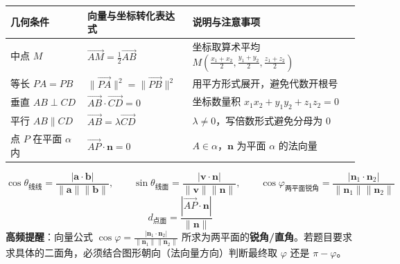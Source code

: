 \documentclass[11pt,a4paper]{ctexart}
\begin{document}
\begin{tcolorbox}[colback=white,colframe=rulecolor,boxrule=0.55pt,arc=1mm,title={四、常见几何条件的坐标翻译表},fonttitle=\bfseries]
\begin{tabularx}{\textwidth}{p{3.5cm}Xp{4.2cm}}
\toprule
几何条件 & 向量与坐标转化表达式 & 说明与注意事项 \\
\midrule
中点 $M$ & $\overrightarrow{AM} = \frac{1}{2}\overrightarrow{AB}$ & 坐标取算术平均 $M\left(\frac{x_1+x_2}{2},\frac{y_1+y_2}{2},\frac{z_1+z_2}{2}\right)$ \\ \hline
等长 $PA=PB$ & $\|\overrightarrow{PA}\|^2 = \|\overrightarrow{PB}\|^2$ & 用平方形式展开，避免代数开根号 \\ \hline
垂直 $AB\perp CD$ & $\overrightarrow{AB}\cdot\overrightarrow{CD} = 0$ & 坐标数量积 $x_1 x_2 + y_1 y_2 + z_1 z_2 = 0$ \\ \hline
平行 $AB\parallel CD$ & $\overrightarrow{AB} = \lambda\overrightarrow{CD}$ & $\lambda\neq 0$，写倍数形式避免分母为 $0$ \\ \hline
点 $P$ 在平面 $\alpha$ 内 & $\overrightarrow{AP}\cdot\boldsymbol{n} = 0$ & $A\in\alpha$，$\boldsymbol{n}$ 为平面 $\alpha$ 的法向量 \\
\bottomrule
\end{tabularx}
\end{tcolorbox}

\begin{tcolorbox}[colback=white,colframe=rulecolor,boxrule=0.55pt,arc=1mm,title={五、三类空间角与点面距离公式},fonttitle=\bfseries]
\[
  \cos\theta_{\text{线线}} = \frac{|\boldsymbol{a}\cdot\boldsymbol{b}|}{\|\boldsymbol{a}\|\|\boldsymbol{b}\|},
  \qquad
  \sin\theta_{\text{线面}} = \frac{|\boldsymbol{v}\cdot\boldsymbol{n}|}{\|\boldsymbol{v}\|\|\boldsymbol{n}\|},
  \qquad
  \cos\varphi_{\text{两平面锐角}} = \frac{|\boldsymbol{n}_1\cdot\boldsymbol{n}_2|}{\|\boldsymbol{n}_1\|\|\boldsymbol{n}_2\|}
\]
\[
  d_{\text{点面}} = \frac{|\overrightarrow{AP}\cdot\boldsymbol{n}|}{\|\boldsymbol{n}\|}
\]
\textbf{高频提醒}：向量公式 $\cos\varphi = \frac{|\boldsymbol{n}_1\cdot\boldsymbol{n}_2|}{\|\boldsymbol{n}_1\|\|\boldsymbol{n}_2\|}$ 所求为两平面的\textbf{锐角/直角}。若题目要求求具体的二面角，必须结合图形朝向（法向量方向）判断最终取 $\varphi$ 还是 $\pi-\varphi$。
\end{tcolorbox}
\end{document}
